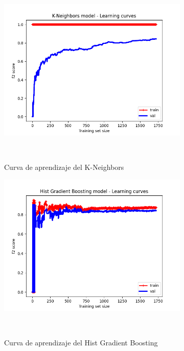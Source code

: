 \begin{figure}[!ht]
\begin{subfigure}[b]{0.3\textwidth}
        \includegraphics[width=\linewidth]{media/images/learning-curves/knn.png}
        \caption{Curva de aprendizaje del K-Neighbors}\ \label{sfig:lc-knn}
    \end{subfigure}
    \begin{subfigure}[b]{0.3\textwidth}
        \includegraphics[width=\linewidth]{media/images/learning-curves/hgb.png}
        \caption{Curva de aprendizaje del Hist Gradient Boosting}\ \label{sfig:lc-hgb}
    \end{subfigure}
    \begin{subfigure}[b]{0.3\textwidth}

\end{subfigure}
\end{figure}
